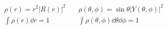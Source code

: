 

\vspace*{\fill}
\centering

\begin{align*}
    \rho(r) = r^2|R(r)|^2 &\quad \rho(\theta,\phi) = \sin{\theta}|Y(\theta,\phi)|^2 \\
    \int \rho(r) \dd{r} = 1 &\quad \int \rho(\theta,\phi) \dd{\theta}\dd{\phi} = 1
\end{align*}

\centering
\vspace*{\fill}

